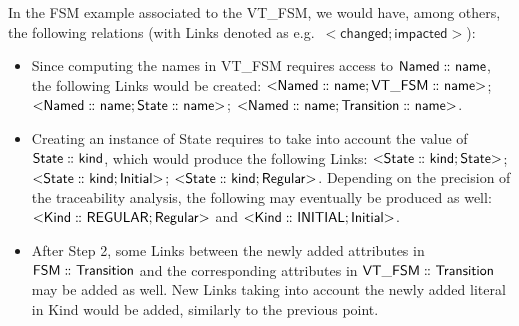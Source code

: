 In the \textsf{FSM} example associated to the \textsf{VT\_FSM},
we would have, among others, the following relations (with \textsf{Link}s denoted 
as e.g.~$\mathsf{<} \mathsf{changed} ; \mathsf{impacted} \mathsf{>}$):
\begin{itemize}
	\item Since computing the \textsf{name}s in \textsf{VT\_FSM} requires access
	to $\mathsf{Named \,\colon\!\!\!\colon name}$, the following \textsf{Link}s would be
	created: 
	$\mathsf{<} \mathsf{Named \,\colon\!\!\!\colon name} ; \mathsf{VT\_FSM \,\colon\!\!\!\colon name} \mathsf{>}$;
	$\mathsf{<} \mathsf{Named \,\colon\!\!\!\colon name} ; \mathsf{State \,\colon\!\!\!\colon name} \mathsf{>}$;
	$\mathsf{<} \mathsf{Named \,\colon\!\!\!\colon name} ; \mathsf{Transition \,\colon\!\!\!\colon name} \mathsf{>}$.

	\item Creating an instance of \textsf{State} requires to take into account
	the value of $\mathsf{State \,\colon\!\!\!\colon kind}$, which would produce the following
	\textsf{Link}s: 
	$\mathsf{<} \mathsf{State \,\colon\!\!\!\colon kind} ; \mathsf{State} \mathsf{>}$;
	$\mathsf{<} \mathsf{State \,\colon\!\!\!\colon kind} ; \mathsf{Initial} \mathsf{>}$;
	$\mathsf{<} \mathsf{State \,\colon\!\!\!\colon kind} ; \mathsf{Regular} \mathsf{>}$.
	Depending on the precision of the traceability analysis, the following may
	eventually be produced as well: 
	$\mathsf{<} \mathsf{Kind \,\colon\!\!\!\colon REGULAR} ; \mathsf{Regular} \mathsf{>}$ and
	$\mathsf{<} \mathsf{Kind \,\colon\!\!\!\colon INITIAL} ; \mathsf{Initial} \mathsf{>}$.
	


	\item After Step 2, some \textsf{Link}s between the newly added attributes
	in $\mathsf{FSM \,\colon\!\!\!\colon Transition}$ and the corresponding attributes in 
	$\mathsf{VT\_FSM \,\colon\!\!\!\colon Transition}$ may be added as well. New 
	\textsf{Link}s taking into account the newly added literal in \textsf{Kind}
	would be added, similarly to the previous point.
\end{itemize}